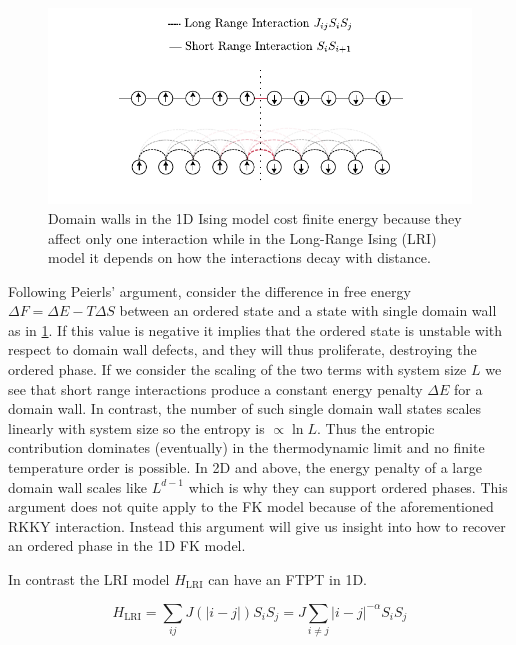 \hypertarget{fig:ising_model_domain_wall}{%
\begin{figure}
\centering
\includegraphics[width=1\textwidth,height=\textheight]{figure_code/intro_chapter/ising_model_domain_wall}
\caption[{Domain walls in the long-range Ising Model}]{Domain walls in the 1D Ising model cost finite energy because they affect only one interaction while in the Long-Range Ising (LRI) model it depends on how the interactions decay with distance.}
\label{fig:ising_model_domain_wall}
\end{figure}
}

Following Peierls' argument, consider the difference in free energy \(\Delta F = \Delta E - T\Delta S\) between an ordered state and a state with single domain wall as in \cref{fig:ising_model_domain_wall}. If this value is negative it implies that the ordered state is unstable with respect to domain wall defects, and they will thus proliferate, destroying the ordered phase. If we consider the scaling of the two terms with system size \(L\) we see that short range interactions produce a constant energy penalty \(\Delta E\) for a domain wall. In contrast, the number of such single domain wall states scales linearly with system size so the entropy is \(\propto \ln L\). Thus the entropic contribution dominates (eventually) in the thermodynamic limit and no finite temperature order is possible. In 2D and above, the energy penalty of a large domain wall scales like \(L^{d-1}\) which is why they can support ordered phases. This argument does not quite apply to the FK model because of the aforementioned RKKY interaction. Instead this argument will give us insight into how to recover an ordered phase in the 1D FK model.

In contrast the LRI model \(H_{\mathrm{LRI}}\) can have an FTPT in 1D.

\[H_{\mathrm{LRI}} = \sum_{ij} J(|i-j|) S_i S_j = J \sum_{i\neq j} |i - j|^{-\alpha} S_i S_j\]

